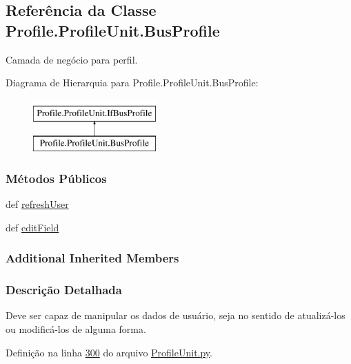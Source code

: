 \hypertarget{classProfile_1_1ProfileUnit_1_1BusProfile}{\subsection{Referência da Classe Profile.\-Profile\-Unit.\-Bus\-Profile}
\label{classProfile_1_1ProfileUnit_1_1BusProfile}
}


Camada de negócio para perfil.  


Diagrama de Hierarquia para Profile.\-Profile\-Unit.\-Bus\-Profile\-:\begin{figure}[H]
\begin{center}
\leavevmode
\includegraphics[height=2.000000cm]{df/da4/classProfile_1_1ProfileUnit_1_1BusProfile}
\end{center}
\end{figure}
\subsubsection*{Métodos Públicos}
\begin{DoxyCompactItemize}
\item 
def \hyperlink{classProfile_1_1ProfileUnit_1_1BusProfile_a87c3d0374f709af7904656938eafd6d3}{refresh\-User}
\item 
def \hyperlink{classProfile_1_1ProfileUnit_1_1BusProfile_a5c116d007081ffefcc1c45cd34c88e10}{edit\-Field}
\end{DoxyCompactItemize}
\subsubsection*{Additional Inherited Members}


\subsubsection{Descrição Detalhada}
Deve ser capaz de manipular os dados de usuário, seja no sentido de atualizá-\/los ou modificá-\/los de alguma forma. 

Definição na linha \hyperlink{ProfileUnit_8py_source_l00300}{300} do arquivo \hyperlink{ProfileUnit_8py_source}{Profile\-Unit.\-py}.



